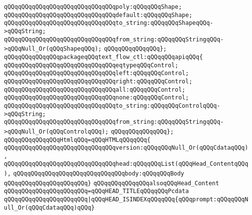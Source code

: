 \verb|qQQqqQQqqQQqqQQqqQQqqQQqqQQqqQQqpoly:qQQqqQQqShape;|\newline
\verb|qQQqqQQqqQQqqQQqqQQqqQQqqQQqqQQqdefault:qQQqqQQqShape;|\newline
\verb|qQQqqQQqqQQqqQQqqQQqqQQqqQQqqQQqto_string:qQQqqQQqShapeqQQq->qQQqString;|\newline
\verb|qQQqqQQqqQQqqQQqqQQqqQQqqQQqqQQqfrom_string:qQQqqQQqStringqQQq->qQQqNull_Or(qQQqShapeqQQq);|\newline
\verb|qQQqqQQqqQQqqQQq};|\newline
\newline
\verb|qQQqqQQqqQQqqQQqpackageqQQqtext_flow_ctl:qQQqqQQqapiqQQq{|\newline
\verb|qQQqqQQqqQQqqQQqqQQqqQQqqQQqqQQqeqtypeqQQqControl;|\newline
\verb|qQQqqQQqqQQqqQQqqQQqqQQqqQQqqQQqleft:qQQqqQQqControl;|\newline
\verb|qQQqqQQqqQQqqQQqqQQqqQQqqQQqqQQqright:qQQqqQQqControl;|\newline
\verb|qQQqqQQqqQQqqQQqqQQqqQQqqQQqqQQqall:qQQqqQQqControl;|\newline
\verb|qQQqqQQqqQQqqQQqqQQqqQQqqQQqqQQqnone:qQQqqQQqControl;|\newline
\verb|qQQqqQQqqQQqqQQqqQQqqQQqqQQqqQQqto_string:qQQqqQQqControlqQQq->qQQqString;|\newline
\verb|qQQqqQQqqQQqqQQqqQQqqQQqqQQqqQQqfrom_string:qQQqqQQqStringqQQq->qQQqNull_Or(qQQqControlqQQq);|\newline
\verb|qQQqqQQqqQQqqQQq};|\newline
\newline
\verb|qQQqqQQqqQQqqQQqHtmlqQQq=qQQqHTMLqQQqqQQq{|\newline
\verb|qQQqqQQqqQQqqQQqqQQqqQQqqQQqqQQqversion:qQQqqQQqNull_Or(qQQqCdataqQQq),|\newline
\verb|qQQqqQQqqQQqqQQqqQQqqQQqqQQqqQQqhead:qQQqqQQqList(qQQqHead_ContentqQQq),|\newline
\verb|qQQqqQQqqQQqqQQqqQQqqQQqqQQqqQQqbody:qQQqqQQqBody|\newline
\verb|qQQqqQQqqQQqqQQqqQQqqQQq}|\newline
\newline
\verb|qQQqqQQqqQQqqQQqalsoqQQqHead_Content|\newline
\verb|qQQqqQQqqQQqqQQqqQQqqQQq=qQQqHEAD_TITLEqQQqqQQqPcdata|\newline
\verb|qQQqqQQqqQQqqQQqqQQqqQQq|\verb#|qQQqHEAD_ISINDEXqQQqqQQq{qQQqprompt:qQQqqQQqNull_Or(qQQqCdataqQQq)qQQq}#\newline
